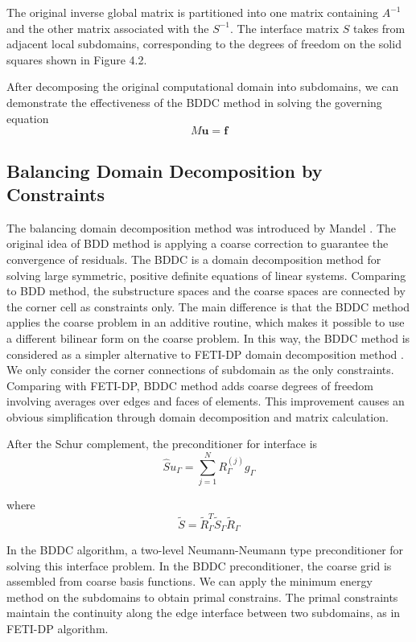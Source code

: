 The original inverse global matrix  is partitioned into one matrix containing $ A^{-1} $ and the other matrix associated with the $ S^{-1} $. The interface matrix $ S $ takes from adjacent local subdomains, corresponding to the degrees of freedom on the solid squares shown in Figure 4.2. 

After decomposing the original computational domain into subdomains, we  can demonstrate the effectiveness of the BDDC method in solving the governing equation
\begin{equation}
{M}\mathbf{u} = \mathbf{f}
\end{equation}


\subsection{Balancing Domain Decomposition by Constraints}

The balancing domain decomposition method was introduced by Mandel \cite{mandel2005algebraic}. The original idea of BDD method is applying a coarse correction to guarantee the convergence of residuals. The BDDC is a domain decomposition method for solving large symmetric, positive definite equations of linear systems. Comparing to BDD method, the substructure spaces and the coarse spaces are connected by the corner cell as constraints only. The main difference is that the BDDC method applies the coarse problem in an additive routine, which makes it possible to use a different bilinear form on the coarse problem. In this way, the BDDC method is considered as a simpler alternative to FETI-DP domain decomposition method \cite{li2006feti}. We only consider the corner connections of subdomain as the only constraints. Comparing with FETI-DP, BDDC method adds coarse degrees of freedom involving averages over edges and faces of elements. This improvement causes an obvious simplification through domain decomposition and matrix calculation.

After the Schur complement, the preconditioner for interface is 
\begin{equation}
\hat{S}u_{\Gamma} = \sum_{j = 1}^{N} R_{\Gamma}^{(j)} g_{\Gamma}
\end{equation}

where
\begin{equation}
\tilde{S} = \tilde{R}_{\Gamma}^{T} \tilde{S}_{\Gamma} \tilde{R}_{\Gamma}
\end{equation}

In the BDDC algorithm, a two-level Neumann-Neumann type preconditioner for solving this interface problem. In the BDDC preconditioner, the coarse grid is assembled from coarse basis functions. We can apply the minimum energy method on the subdomains to obtain primal constrains. The primal constraints maintain the continuity along the edge interface between two subdomains, as in FETI-DP algorithm. 

